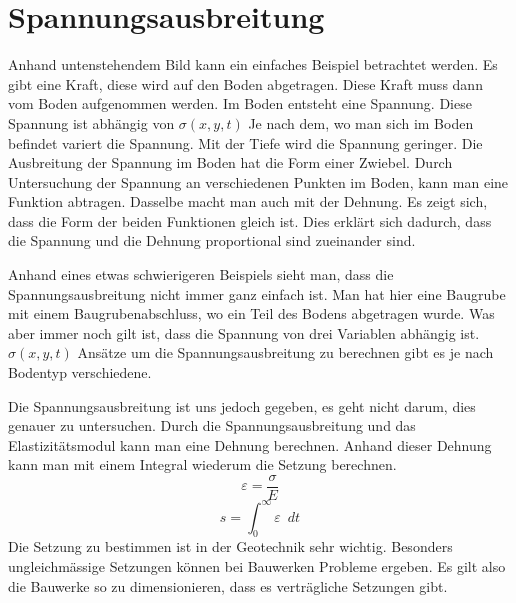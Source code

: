 \section{Spannungsausbreitung\label{spannung:section:Spannungsausbreitung}}
Anhand untenstehendem Bild kann ein einfaches Beispiel betrachtet werden.
Es gibt eine Kraft, diese wird auf den Boden abgetragen.
Diese Kraft muss dann vom Boden aufgenommen werden.
Im Boden entsteht eine Spannung. Diese Spannung ist abhängig von $\sigma(x,y,t)$
Je nach dem, wo man sich im Boden befindet variert die Spannung.
Mit der Tiefe wird die Spannung geringer.
Die Ausbreitung der Spannung im Boden hat die Form einer Zwiebel.
Durch Untersuchung der Spannung an verschiedenen Punkten im Boden, kann man eine Funktion abtragen.
Dasselbe macht man auch mit der Dehnung. Es zeigt sich, dass die Form der beiden Funktionen gleich ist.
Dies erklärt sich dadurch, dass die Spannung und die Dehnung proportional sind zueinander sind.

Anhand eines etwas schwierigeren Beispiels sieht man,
dass die Spannungsausbreitung nicht immer ganz einfach ist.
Man hat hier eine Baugrube mit einem Baugrubenabschluss, wo ein Teil des Bodens abgetragen wurde.
Was aber immer noch gilt ist, dass die Spannung von drei Variablen abhängig ist. $\sigma(x,y,t)$
Ansätze um die Spannungsausbreitung zu berechnen gibt es je nach Bodentyp verschiedene.

Die Spannungsausbreitung ist uns jedoch gegeben, es geht nicht darum, dies genauer zu untersuchen.
Durch die Spannungsausbreitung und das Elastizitätsmodul kann man eine Dehnung berechnen.
Anhand dieser Dehnung kann man mit einem Integral wiederum die Setzung berechnen.
\[
\varepsilon
=
\frac{\sigma}{E}
\]
\[
s
=
\int_{0}^{\infty}\varepsilon\enspace dt
\]
Die Setzung zu bestimmen ist in der Geotechnik sehr wichtig.
Besonders ungleichmässige Setzungen können bei Bauwerken Probleme ergeben.
Es gilt also die Bauwerke so zu dimensionieren, dass es verträgliche Setzungen gibt.


